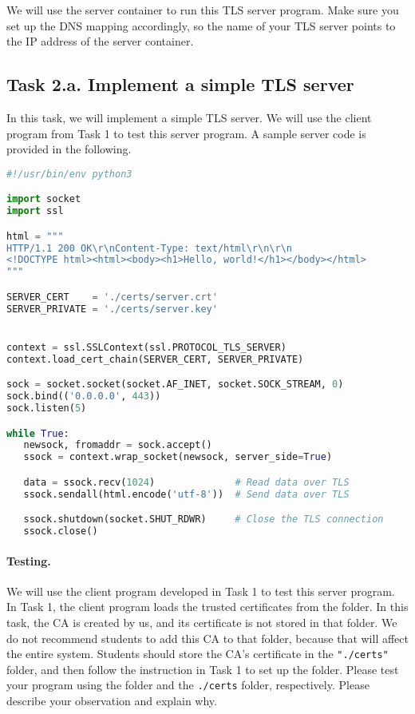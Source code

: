 We will use the server container to run this TLS server program.
Make sure you set up the DNS mapping accordingly, so 
the name of your TLS server points to the IP address of the 
server container. 




\subsection{Task 2.a. Implement a simple TLS server}

In this task, we will implement a simple TLS server. We will
use the client program from Task 1 to test this server program.
A sample server code is provided in the following.


\begin{lstlisting}[caption={\texttt{server.py} (in \texttt{Labsetup/volumes})}, 
                   label={tls:server}, language=Python]
#!/usr/bin/env python3

import socket
import ssl

html = """
HTTP/1.1 200 OK\r\nContent-Type: text/html\r\n\r\n
<!DOCTYPE html><html><body><h1>Hello, world!</h1></body></html>
"""

SERVER_CERT    = './certs/server.crt'
SERVER_PRIVATE = './certs/server.key'


context = ssl.SSLContext(ssl.PROTOCOL_TLS_SERVER) 
context.load_cert_chain(SERVER_CERT, SERVER_PRIVATE)

sock = socket.socket(socket.AF_INET, socket.SOCK_STREAM, 0)
sock.bind(('0.0.0.0', 443))
sock.listen(5)

while True:
   newsock, fromaddr = sock.accept()
   ssock = context.wrap_socket(newsock, server_side=True)

   data = ssock.recv(1024)              # Read data over TLS
   ssock.sendall(html.encode('utf-8'))  # Send data over TLS

   ssock.shutdown(socket.SHUT_RDWR)     # Close the TLS connection
   ssock.close()
\end{lstlisting}
 


\paragraph{Testing.}
We will use the client program developed in Task 1 to test this 
server program.
In Task 1, the client program loads the trusted certificates from the 
 folder. 
In this task, the CA is created by us, and its
certificate is not stored in that folder. We do not recommend students 
to add this CA to that folder, because that will affect the entire 
system. Students should store the CA's certificate in 
the \texttt{"./certs"} folder, and then follow the instruction
in Task 1 to set up the folder. 
Please test your program using the  folder
and the \texttt{./certs} folder, respectively. 
Please describe your observation and explain why.



